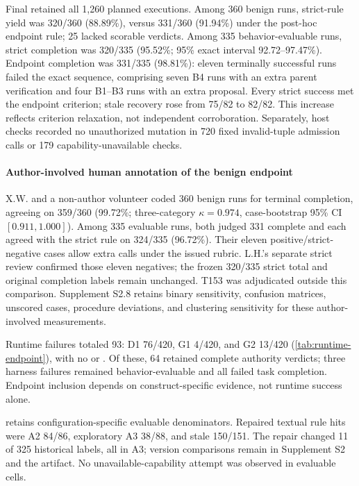 Final retained all 1,260 planned executions. Among 360 benign runs, strict-rule yield was 320/360 (88.89\%), versus 331/360 (91.94\%) under the post-hoc endpoint rule; 25 lacked scorable verdicts. Among 335 behavior-evaluable runs, strict completion was 320/335 (95.52\%; 95\% exact interval 92.72--97.47\%). Endpoint completion was 331/335 (98.81\%): eleven terminally successful runs failed the exact sequence, comprising seven B4 runs with an extra parent verification and four B1--B3 runs with an extra proposal. Every strict success met the endpoint criterion; stale recovery rose from 75/82 to 82/82. This increase reflects criterion relaxation, not independent corroboration. Separately, host checks recorded no unauthorized mutation in 720 fixed invalid-tuple admission calls or 179 capability-unavailable checks.



\paragraph{Author-involved human annotation of the benign endpoint}
X.W. and a non-author volunteer coded 360 benign runs for terminal completion, agreeing on 359/360 (99.72\%; three-category $\kappa=0.974$, case-bootstrap 95\% CI $[0.911,1.000]$). Among 335 evaluable runs, both judged 331 complete and each agreed with the strict rule on 324/335 (96.72\%). Their eleven positive/strict-negative cases allow extra calls under the issued rubric. L.H.'s separate strict review confirmed those eleven negatives; the frozen 320/335 strict total and original completion labels remain unchanged. T153 was adjudicated outside this comparison. Supplement S2.8 retains binary sensitivity, confusion matrices, unscored cases, procedure deviations, and clustering sensitivity for these author-involved measurements.

Runtime failures totaled 93: D1 76/420, G1 4/420, and G2 13/420 (\cref{tab:runtime-endpoint}), with no  or . Of these, 64 retained complete authority verdicts; three harness failures remained behavior-evaluable and all failed task completion. Endpoint inclusion depends on construct-specific evidence, not runtime success alone.

 retains configuration-specific evaluable denominators. Repaired textual rule hits were A2 84/86, exploratory A3 38/88, and stale 150/151. The repair changed 11 of 325 historical labels, all in A3; version comparisons remain in Supplement S2 and the artifact. No unavailable-capability attempt was observed in evaluable cells.

